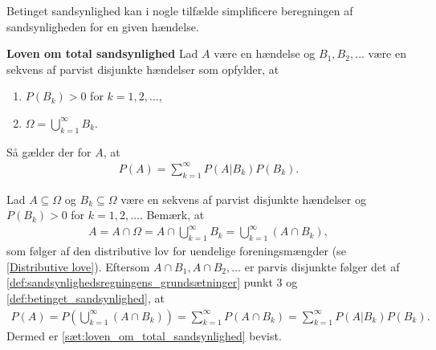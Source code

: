 Betinget sandsynlighed kan i nogle tilfælde simplificere beregningen af sandsynligheden for en given hændelse. 

\begin{minipage}\textwidth
\begin{thmx} \textbf{Loven om total sandsynlighed} \label{sæt:loven_om_total_sandsynlighed} %
\newline
Lad $A$ være en hændelse og $B_1,B_2,\dots$ være en sekvens af parvist disjunkte hændelser som opfylder, at
\begin{enumerate}
\item $P(B_k)>0$ for $k=1,2,\dots$,
\item $\Omega=\displaystyle\bigcup_{k=1}^\infty B_k$.
\end{enumerate}
Så gælder der for $A$, at
\begin{align*}
    P(A)=\sum_{k=1}^\infty P(A|B_k)P(B_k).
\end{align*}
\end{thmx}
\end{minipage}
\begin{bev} \textbf{} %
\newline
Lad $A\subseteq \Omega$ og $B_k \subseteq \Omega $ være en sekvens af parvist disjunkte hændelser og $P(B_k)>0$ for $k=1,2,\dots$. Bemærk, at
\begin{align*}
    A=A\cap \Omega=A\cap\bigcup_{k=1}^\infty B_k=\bigcup_{k=1}^\infty(A\cap B_k),
\end{align*}
som følger af den distributive lov for uendelige foreningsmængder (se \autoref{Distributive love}). 
Eftersom $A\cap B_1,A\cap B_2,\dots$ er parvis disjunkte følger det af \autoref{def:sandsynlighedsregningens_grundsætninger} punkt 3 og \autoref{def:betinget_sandsynlighed}, at
\begin{align*}
    P(A)=P\left(\bigcup_{k=1}^\infty(A\cap B_k)\right) =\sum_{k=1}^\infty P(A\cap B_k)=\sum_{k=1}^\infty P(A|B_k)P(B_k).
\end{align*}
Dermed er \autoref{sæt:loven_om_total_sandsynlighed} bevist.
\end{bev}


